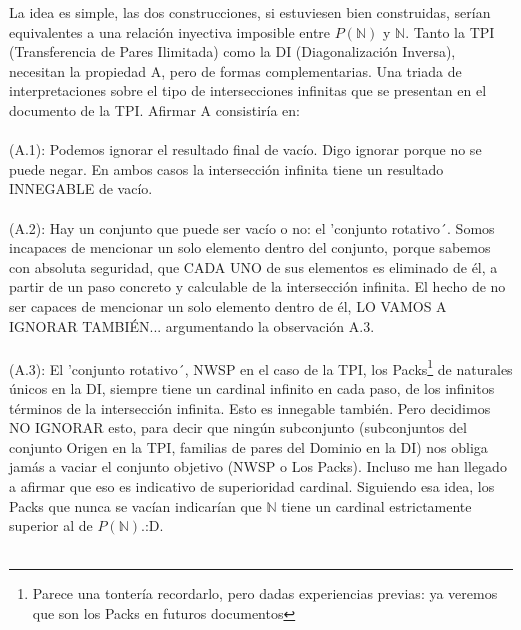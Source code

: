 	\noindent
	La idea es simple, las dos construcciones, si estuviesen bien construidas, serían equivalentes a una relación inyectiva imposible entre $P(\mathbb{N})$ y $\mathbb{N}$. Tanto la TPI (Transferencia de Pares Ilimitada) como la DI (Diagonalización Inversa), necesitan la propiedad A, pero de formas complementarias. Una triada de interpretaciones sobre el tipo de intersecciones infinitas que se presentan en el documento de la TPI. Afirmar A consistiría en:\\\\
	(A.1): Podemos ignorar el resultado final de vacío. Digo ignorar porque no se puede negar. En ambos casos la intersección infinita tiene un resultado INNEGABLE de vacío.\\\\
	(A.2): Hay un conjunto que puede ser vacío o no: el 'conjunto rotativo´. Somos incapaces de mencionar un solo elemento dentro del conjunto, porque sabemos con absoluta seguridad, que CADA UNO de sus elementos es eliminado de él, a partir de un paso concreto y calculable de la intersección infinita. El hecho de no ser capaces de mencionar un solo elemento dentro de él, LO VAMOS A IGNORAR TAMBIÉN... argumentando la observación A.3.\\\\
	(A.3): El 'conjunto rotativo´, NWSP en el caso de la TPI, los Packs\footnote{Parece una tontería recordarlo, pero dadas experiencias previas: ya veremos que son los Packs en futuros documentos} de naturales únicos en la DI, siempre tiene un cardinal infinito en cada paso, de los infinitos términos de la intersección infinita. Esto es innegable también. Pero decidimos NO IGNORAR esto, para decir que ningún subconjunto (subconjuntos del conjunto Origen en la TPI, familias de pares del Dominio en la DI) nos obliga jamás a vaciar el conjunto objetivo (NWSP o Los Packs). Incluso me han llegado a afirmar que eso es indicativo de superioridad cardinal. Siguiendo esa idea, los Packs que nunca se vacían indicarían que $\mathbb{N}$ tiene un cardinal estrictamente superior al de $P(\mathbb{N})$.:D.\\\\
	
